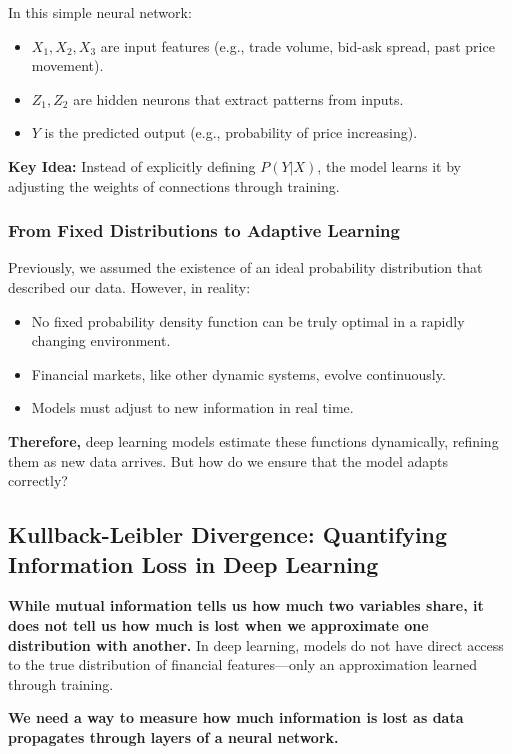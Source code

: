 In this simple neural network:
\begin{itemize}
    \item \( X_1, X_2, X_3 \) are input features (e.g., trade volume, bid-ask spread, past price movement).
    \item \( Z_1, Z_2 \) are hidden neurons that extract patterns from inputs.
    \item \( Y \) is the predicted output (e.g., probability of price increasing).
\end{itemize}

\textbf{Key Idea:} Instead of explicitly defining \( P(Y | X) \), the model learns it by adjusting the weights of connections through training.

\subsubsection*{From Fixed Distributions to Adaptive Learning}

Previously, we assumed the existence of an ideal probability distribution that described our data. However, in reality:

\begin{itemize}
    \item No fixed probability density function can be truly optimal in a rapidly changing environment.
    \item Financial markets, like other dynamic systems, evolve continuously.
    \item Models must adjust to new information in real time.
\end{itemize}

\textbf{Therefore,} deep learning models estimate these functions dynamically, refining them as new data arrives. But how do we ensure that the model adapts correctly?

\subsection{Kullback-Leibler Divergence: Quantifying Information Loss in Deep Learning}

\textbf{While mutual information tells us how much two variables share, it does not tell us how much is lost when we approximate one distribution with another.} In deep learning, models do not have direct access to the true distribution of financial features—only an approximation learned through training.

\textbf{We need a way to measure how much information is lost as data propagates through layers of a neural network.}

